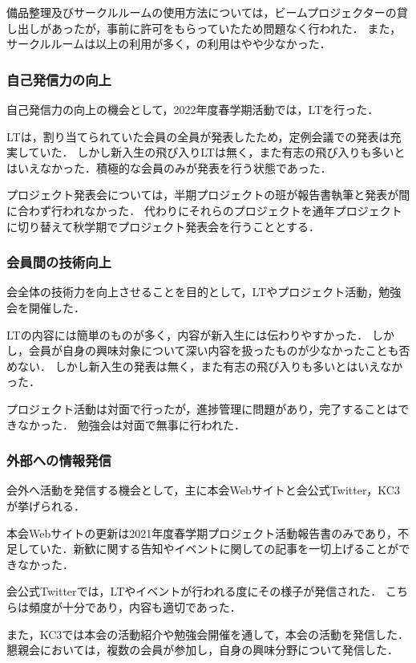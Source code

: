 備品整理及びサークルルームの使用方法については，ビームプロジェクターの貸し出しがあったが，事前に許可をもらっていたため問題なく行われた．
また，サークルルームは\secondGrade{}以上の利用が多く，\firstGrade{}の利用はやや少なかった．

\subsubsection*{自己発信力の向上}
自己発信力の向上の機会として，2022年度春学期活動では，LTを行った．

LTは，割り当てられていた会員の全員が発表したため，定例会議での発表は充実していた．
しかし新入生の飛び入りLTは無く，また有志の飛び入りも多いとはいえなかった．積極的な会員のみが発表を行う状態であった．

プロジェクト発表会については，半期プロジェクトの班が報告書執筆と発表が間に合わず行われなかった．
代わりにそれらのプロジェクトを通年プロジェクトに切り替えて秋学期でプロジェクト発表会を行うこととする．

\subsubsection*{会員間の技術向上}
会全体の技術力を向上させることを目的として，LTやプロジェクト活動，勉強会を開催した．

LTの内容には簡単のものが多く，内容が新入生には伝わりやすかった．
しかし，会員が自身の興味対象について深い内容を扱ったものが少なかったことも否めない．
しかし新入生の発表は無く，また有志の飛び入りも多いとはいえなかった．

プロジェクト活動は対面で行ったが，進捗管理に問題があり，完了することはできなかった．
勉強会は対面で無事に行われた．

\subsubsection*{外部への情報発信}
会外へ活動を発信する機会として，主に本会Webサイトと会公式Twitter，KC3が挙げられる．

本会Webサイトの更新は2021年度春学期プロジェクト活動報告書のみであり，不足していた．新歓に関する告知やイベントに関しての記事を一切上げることができなかった．

会公式Twitterでは，LTやイベントが行われる度にその様子が発信された．
こちらは頻度が十分であり，内容も適切であった．

また，KC3では本会の活動紹介や勉強会開催を通して，本会の活動を発信した．
懇親会においては，複数の会員が参加し，自身の興味分野について発信した．


